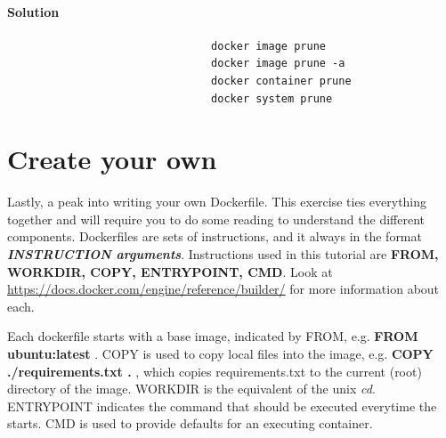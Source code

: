 \documentclass[12pt]{article}
\begin{document}
					\paragraph{Solution}	
				
						\begin{minipage}{\linewidth}
							\begin{lstlisting}
								docker image prune
								docker image prune -a
								docker container prune
								docker system prune
							\end{lstlisting}
						\end{minipage}
				
	\section{Create your own}
		Lastly, a peak into writing your own Dockerfile.
		This exercise ties everything together and will require you to do some reading to understand the different components.
		Dockerfiles are sets of instructions, and it always in the format \textit{ \textbf{INSTRUCTION arguments}}.
		Instructions used in this tutorial are \textbf{FROM, WORKDIR, COPY, ENTRYPOINT, CMD}.
		Look at \url{https://docs.docker.com/engine/reference/builder/} for more information about each.
		
		Each dockerfile starts with a base image, indicated by FROM, e.g. \textbf{FROM ubuntu:latest} .
		COPY is used to copy local files into the image, e.g. \textbf{COPY ./requirements.txt .} , which copies requirements.txt  to the current (root) directory of the image.
		WORKDIR is the equivalent of the unix \textit{cd}.
		ENTRYPOINT indicates the command that should be executed everytime the starts. 
		CMD is used to provide defaults for an executing container.

		
\end{document}
